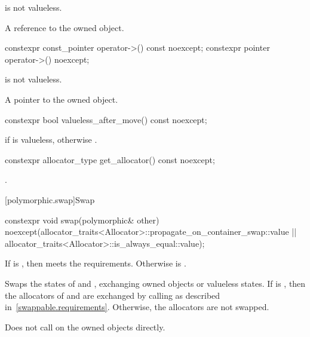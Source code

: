 \begin{itemdescr}
\pnum
\expects
{} is not valueless.

\pnum
\returns
A reference to the owned object.
\end{itemdescr}

%
\begin{itemdecl}
constexpr const_pointer operator->() const noexcept;
constexpr pointer operator->() noexcept;
\end{itemdecl}

\begin{itemdescr}
\pnum
\expects
{} is not valueless.

\pnum
\returns
A pointer to the owned object.
\end{itemdescr}

%
\begin{itemdecl}
constexpr bool valueless_after_move() const noexcept;
\end{itemdecl}

\begin{itemdescr}
\pnum
\returns
{} if  is valueless, otherwise .
\end{itemdescr}

%
\begin{itemdecl}
constexpr allocator_type get_allocator() const noexcept;
\end{itemdecl}

\begin{itemdescr}
\pnum
\returns
{}.
\end{itemdescr}

[polymorphic.swap]{Swap}

%
\begin{itemdecl}
constexpr void swap(polymorphic& other)
  noexcept(allocator_traits<Allocator>::propagate_on_container_swap::value ||
           allocator_traits<Allocator>::is_always_equal::value);
\end{itemdecl}

\begin{itemdescr}
\pnum
\expects
If 
is , then
 meets the  requirements.
Otherwise  is .

\pnum
\effects
Swaps the states of  and ,
exchanging owned objects or valueless states.
If 
is , then
the allocators of  and 
are exchanged by calling 
as described in~\ref{swappable.requirements}.
Otherwise,
the allocators are not swapped.
\begin{note}
Does not call  on the owned objects directly.
\end{note}
\end{itemdescr}

